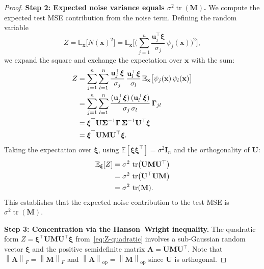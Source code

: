\documentclass[12pt]{amsart}
\theoremstyle{definition}
\theoremstyle{remark}
\DeclareMathOperator{\tr}{tr}
\newcommand{\E}{\mathbb{E}}
\newcommand{\bx}{\mathbf{x}}
\newcommand{\bM}{\mathbf{M}}
\newcommand{\bU}{\mathbf{U}}
\newcommand{\bI}{\mathbf{I}}
\newcommand{\bu}{\mathbf{u}}
\newcommand{\norm}[1]{\left\lVert #1 \right\rVert}
\begin{document}
\begin{proof}
\medskip
\noindent\textbf{Step 2: Expected noise variance equals $\sigma^{2}\tr(\bM)$.}
We compute the expected test MSE contribution from the noise term.  Defining the
random variable
\begin{equation}\label{eq:Z}
  Z = \E_{\bx}\bigl[N(\bx)^{2}\bigr]
    = \E_{\bx}\Biggl[
        \Biggl(
          \sum_{j=1}^{n}
          \frac{\bu_{j}^{\top}\boldsymbol{\xi}}{\sigma_{j}}\,\psi_{j}(\bx)
        \Biggr)^{\!2}
      \Biggr],
\end{equation}
we expand the square and exchange the expectation over $\bx$ with the sum:
\begin{align}
  Z &= \sum_{j=1}^{n} \sum_{l=1}^{n}
       \frac{\bu_{j}^{\top}\boldsymbol{\xi}}{\sigma_{j}}\,
       \frac{\bu_{l}^{\top}\boldsymbol{\xi}}{\sigma_{l}}\,
       \E_{\bx}\bigl[\psi_{j}(\bx)\,\psi_{l}(\bx)\bigr] \notag \\
    &= \sum_{j=1}^{n} \sum_{l=1}^{n}
       \frac{(\bu_{j}^{\top}\boldsymbol{\xi})\,
             (\bu_{l}^{\top}\boldsymbol{\xi})}
            {\sigma_{j}\,\sigma_{l}}\,
       \boldsymbol{\Gamma}_{jl} \notag \\
    &= \boldsymbol{\xi}^{\top}
       \bU \boldsymbol{\Sigma}^{-1} \boldsymbol{\Gamma}\,
       \boldsymbol{\Sigma}^{-1} \bU^{\top}
       \boldsymbol{\xi} \notag \\
    &= \boldsymbol{\xi}^{\top}
       \bU \bM \bU^{\top}
       \boldsymbol{\xi}. \label{eq:Z-quadratic}
\end{align}
Taking the expectation over $\boldsymbol{\xi}$, using
$\E[\boldsymbol{\xi}\boldsymbol{\xi}^{\top}] = \sigma^{2}\bI_{n}$ and the
orthogonality of $\bU$:
\begin{align}
  \E_{\boldsymbol{\xi}}[Z]
  &= \sigma^{2}\,\tr\bigl(\bU \bM \bU^{\top}\bigr) \notag \\
  &= \sigma^{2}\,\tr\bigl(\bU^{\top} \bU \bM\bigr) \notag \\
  &= \sigma^{2}\,\tr(\bM). \label{eq:EZ}
\end{align}
This establishes that the expected noise contribution to the test MSE is
$\sigma^{2}\tr(\bM)$.

\medskip
\noindent\textbf{Step 3: Concentration via the Hanson--Wright inequality.}
The quadratic form $Z = \boldsymbol{\xi}^{\top}\bU\bM\bU^{\top}\boldsymbol{\xi}$
from~\eqref{eq:Z-quadratic} involves a sub-Gaussian random vector
$\boldsymbol{\xi}$ and the positive semidefinite matrix
$\mathbf{A} = \bU\bM\bU^{\top}$.  Note that
$\norm{\mathbf{A}}_{F} = \norm{\bM}_{F}$ and
$\norm{\mathbf{A}}_{\mathrm{op}} = \norm{\bM}_{\mathrm{op}}$ since $\bU$ is
orthogonal.


\end{proof}
\end{document}
